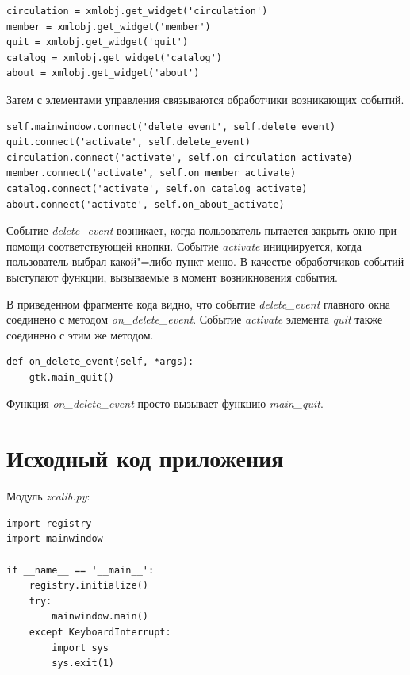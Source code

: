 \documentclass[a4paper,openany,twoside,final]{book}
\providecommand*{\DUroletitlereference}[1]{\textsl{#1}}
\begin{document}
\begin{verbatim}
circulation = xmlobj.get_widget('circulation')
member = xmlobj.get_widget('member')
quit = xmlobj.get_widget('quit')
catalog = xmlobj.get_widget('catalog')
about = xmlobj.get_widget('about')
\end{verbatim}

Затем с элементами управления связываются обработчики возникающих событий.

\begin{verbatim}
self.mainwindow.connect('delete_event', self.delete_event)
quit.connect('activate', self.delete_event)
circulation.connect('activate', self.on_circulation_activate)
member.connect('activate', self.on_member_activate)
catalog.connect('activate', self.on_catalog_activate)
about.connect('activate', self.on_about_activate)
\end{verbatim}

Событие \DUroletitlereference{delete\_event} возникает, когда пользователь пытается закрыть окно при помощи соответствующей кнопки.  Событие \DUroletitlereference{activate} инициируется, когда пользователь выбрал какой"=либо пункт меню.  В качестве обработчиков событий выступают функции, вызываемые в момент возникновения события.

В приведенном фрагменте кода видно, что событие \DUroletitlereference{delete\_event} главного окна соединено с методом \DUroletitlereference{on\_delete\_event}.  Событие \DUroletitlereference{activate} элемента \DUroletitlereference{quit} также соединено с этим же методом.

\begin{verbatim}
def on_delete_event(self, *args):
    gtk.main_quit()
\end{verbatim}

Функция \DUroletitlereference{on\_delete\_event} просто вызывает функцию \DUroletitlereference{main\_quit}.


\section{Исходный код приложения%
  \label{id52}%
}

Модуль \DUroletitlereference{zcalib.py}:

\begin{verbatim}
import registry
import mainwindow

if __name__ == '__main__':
    registry.initialize()
    try:
        mainwindow.main()
    except KeyboardInterrupt:
        import sys
        sys.exit(1)
\end{verbatim}
\end{document}
